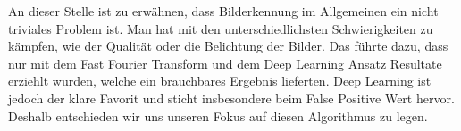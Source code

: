 An dieser Stelle ist zu erwähnen, dass Bilderkennung im Allgemeinen ein nicht triviales Problem ist. Man hat mit den unterschiedlichsten Schwierigkeiten zu kämpfen, wie der Qualität oder die Belichtung der Bilder. Das führte dazu, dass nur mit dem Fast Fourier Transform und dem Deep Learning Ansatz Resultate erziehlt wurden, welche ein brauchbares Ergebnis lieferten. Deep Learning ist jedoch der klare Favorit und sticht insbesondere beim False Positive Wert hervor. Deshalb entschieden wir uns unseren Fokus auf diesen Algorithmus zu legen. 



